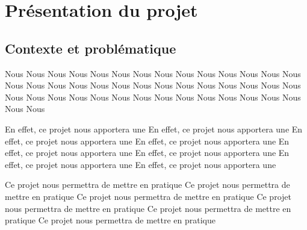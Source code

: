 \section{Présentation du projet}
\subsection{Contexte et problématique}
\setlength{\parindent}{5ex}
Nous Nous Nous Nous Nous Nous Nous Nous Nous Nous Nous Nous Nous Nous Nous Nous Nous Nous Nous Nous Nous Nous
Nous Nous Nous Nous Nous Nous Nous Nous Nous Nous Nous Nous Nous Nous Nous Nous Nous Nous Nous Nous Nous Nous
\newline\indent

En effet, ce projet nous apportera une En effet, ce projet nous apportera une En effet, ce projet nous apportera une En effet, ce projet nous apportera une
En effet, ce projet nous apportera une En effet, ce projet nous apportera une En effet, ce projet nous apportera une En effet, ce projet nous apportera une
\newline\indent

Ce projet nous permettra de mettre en pratique Ce projet nous permettra de mettre en pratique Ce projet nous permettra de mettre en pratique
Ce projet nous permettra de mettre en pratique Ce projet nous permettra de mettre en pratique Ce projet nous permettra de mettre en pratique

